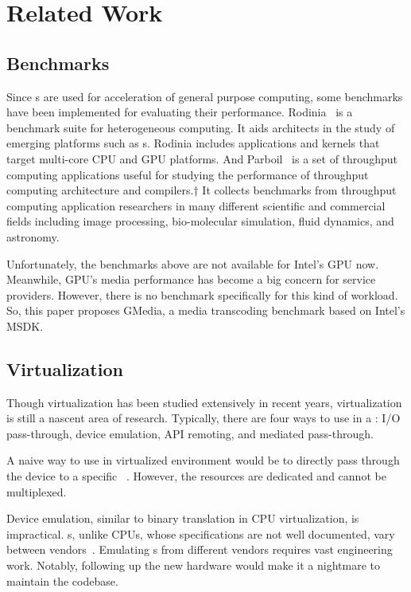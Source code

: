 \section{Related Work}
\label{sec:related_work}

\subsection{\gpu{} Benchmarks}

\hspace{0pt}
Since \gpu{}s are used for acceleration of general purpose computing, some benchmarks have been implemented for evaluating their performance. Rodinia~{\cite{che2009rodinia}} is a benchmark suite for heterogeneous computing. It aids architects in the study of emerging platforms such as \gpu{}s. Rodinia includes applications and kernels that target multi-core CPU and GPU platforms. And Parboil~{\cite{stratton2012parboil}} is a set of throughput computing applications useful for studying the performance of throughput computing architecture and compilers.† It collects benchmarks from throughput computing application researchers in many different scientific and commercial fields including image processing, bio-molecular simulation, fluid dynamics, and astronomy.

Unfortunately, the benchmarks above are not available for Intel's GPU now. Meanwhile, GPU's media performance has become a big concern for service providers. However, there is no benchmark specifically for this kind of workload. So, this paper proposes GMedia, a media transcoding benchmark based on Intel's MSDK.

\subsection{\gpu{} Virtualization}

Though virtualization has been studied extensively in recent years, \gpu{} virtualization is still a nascent area of research. Typically, there are four ways to use \gpu{} in a \vm{}: I/O pass-through, device emulation, API remoting, and mediated pass-through.

A naive way to use \gpu{} in virtualized environment would be to directly pass through the device to a specific \vm{}~{\cite{hiremane2007intel, dong2009towards}}. However, the \gpu{} resources are dedicated and cannot be multiplexed.

Device emulation, similar to binary translation in CPU virtualization, is impractical. \gpu{}s, unlike CPUs, whose specifications are not well documented, vary between vendors~{\cite{dowty2009gpu}}. Emulating \gpu{}s from different vendors requires vast engineering work. Notably, following up the new \gpu{} hardware would make it a nightmare to maintain the codebase.

